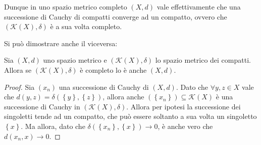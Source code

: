 Dunque in uno spazio metrico completo $\left (X,d\right )$ vale effettivamente che una successione di Cauchy di compatti converge ad un compatto, ovvero che $\left (\mathcal{K}(X),\delta \right ) $ è a sua volta completo.


Si può dimostrare anche il viceversa:
\begin{theorem}
Sia  $\left (X,d\right )$ uno spazio metrico e $\left (\mathcal{K}(X),\delta \right ) $ lo spazio metrico dei compatti. Allora se $\left (\mathcal{K}(X),\delta \right ) $ è completo lo è anche $\left (X,d\right )$.
\end{theorem}
\begin{proof}
Sia $\left( x_n \right)$ una successione di Cauchy di $\left (X,d\right )$. Dato che $\forall y,z \in X$ vale che $d\left( y,z\right)=\delta \left(\left \{y\right \},\left \{z \right \} \right)$, allora anche $\left(\left \{ x_n\right \} \right)\subseteq \mathcal{K}(X)$ è una successione di Cauchy in  $\left (\mathcal{K}(X),\delta \right ) $. Allora per ipotesi la successione dei singoletti tende ad un compatto, che può essere soltanto a sua volta un singoletto $\left \{x \right \}$. Ma allora, dato che $\delta \left ( \left \{ x_n\right \},\left \{x \right \} \right ) \to 0$, è anche vero che $d\left (  x_n,x  \right ) \to 0$.
\end{proof}
